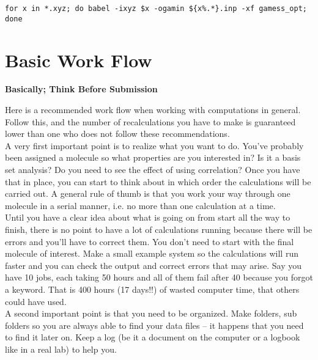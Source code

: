 \documentclass{article}
\begin{document}
\begin{lstlisting}
for x in *.xyz; do babel -ixyz $x -ogamin ${x%.*}.inp -xf gamess_opt; done
\end{lstlisting}

\newpage
\section{Basic Work Flow}

\begin{center}
\bf Basically; Think Before Submission
\end{center}



Here is a recommended work flow when working with computations in general.
Follow this, and the number of recalculations you have to make is guaranteed lower than one who does not follow these recommendations.\\

A very first important point is to realize what you want to do.
You've probably been assigned a molecule so what properties are you interested in?
Is it a basis set analysis?
Do you need to see the effect of using correlation?
Once you have that in place, you can start to think about in which order the calculations will be carried out.
A general rule of thumb is that you work your way through one molecule in a serial manner, i.e. no more than one calculation at a time.\\

Until you have a clear idea about what is going on from start all the way to finish, there is no point to have a lot of calculations running because there will be errors and you'll have to correct them.
You don't need to start with the final molecule of interest.
Make a small example system so the calculations will run faster and you can check the output and correct errors that may arise.
Say you have 10 jobs, each taking 50 hours and all of them fail after 40 because you forgot a keyword.
That is 400 hours (17 days!!) of wasted computer time, that others could have used.\\

A second important point is that you need to be organized.
Make folders, sub folders so you are always able to find your data files – it happens that you need to find it later on.
Keep a log (be it a document on the computer or a logbook like in a real lab) to help you.\\
\end{document}
